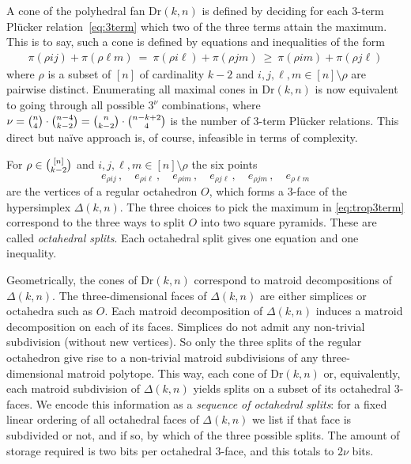 \documentclass[11pt,a4paper]{amsart}
\newcommand{\Hypersimplex}[2]{{\Delta(#1,#2)}}
\newcommand{\Dr}[2]{{\mathrm{Dr}(#1,#2)}}
\theoremstyle{plain}
\theoremstyle{definition}
\begin{document}
A cone of the polyhedral fan $\Dr kn$ is defined by deciding for each $3$-term Pl\"ucker
relation~\eqref{eq:3term} which two of the three terms attain the maximum.  This is to say, such a
cone is defined by equations and inequalities of the form
\begin{align}\label{eq:trop3term}
  \pi(\rho ij)+\pi(\rho\ell m) \ = \ \pi(\rho i\ell)+\pi(\rho jm) \ \ge \ \pi(\rho im)+\pi(\rho j\ell)
\end{align}
where $\rho$ is a subset of $[n]$ of cardinality $k-2$ and $i,j,\ell,m\in[n]\setminus \rho$ are
pairwise distinct.  Enumerating all maximal cones in $\Dr{k}{n}$ is now equivalent to going through
all possible $3^\nu$ combinations, where $\nu=\tbinom{n}{4} \cdot \tbinom {n-4}{k-2}=\tbinom{n}{k-2}
\cdot \tbinom{n-k+2}{4}$ is the number of $3$-term Pl\"ucker relations.  This direct but na\"ive
approach is, of course, infeasible in terms of complexity.

For $\rho\in\tbinom{[n]}{k-2}$ and $i,j,\ell,m\in[n]\setminus \rho$ the six points
\[
e_{\rho ij} \, , \quad e_{\rho i\ell} \, , \quad e_{\rho im} \, , \quad e_{\rho j\ell} \, , \quad
e_{\rho jm} \, , \quad e_{\rho \ell m}
\]
are the vertices of a regular octahedron $O$, which forms a $3$-face of the hypersimplex
$\Delta(k,n)$.  The three choices to pick the maximum in \eqref{eq:trop3term} correspond to the
three ways to split $O$ into two square pyramids.  These are called \emph{octahedral splits}.  Each
octahedral split gives one equation and one inequality.

Geometrically, the cones of $\Dr kn$ correspond to matroid decompositions of $\Hypersimplex{k}{n}$.  The
three-dimensional faces of $\Hypersimplex{k}{n}$ are either simplices or octahedra such as $O$.  Each matroid
decomposition of $\Hypersimplex kn$ induces a matroid decomposition on each of its faces.  Simplices do not
admit any non-trivial subdivision (without new vertices).  So only the three splits of the regular
octahedron give rise to a non-trivial matroid subdivisions of any three-dimensional matroid polytope.
This way, each cone of $\Dr kn$ or, equivalently, each matroid subdivision of $\Hypersimplex{k}{n}$ yields
splits on a subset of its octahedral $3$-faces.  We encode this information as a \emph{sequence of
  octahedral splits}: for a fixed linear ordering of all octahedral faces of $\Hypersimplex{k}{n}$ we list
if that face is subdivided or not, and if so, by which of the three possible splits.  The amount of
storage required is two bits per octahedral $3$-face, and this totals to $2\nu$ bits.
\end{document}
